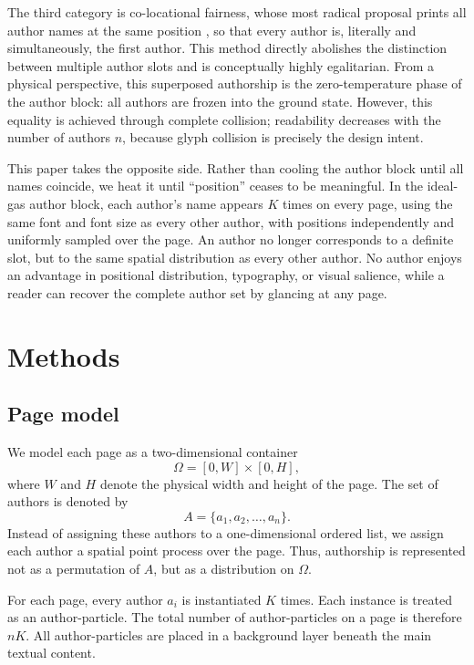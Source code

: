 \documentclass[10pt,letterpaper]{article}
\theoremstyle{definition}
\theoremstyle{remark}
\begin{document}
The third category is {co-locational fairness}, whose most radical proposal prints all author names at the same position \cite{demaine}, so that every author is, literally and simultaneously, the first author. This method directly abolishes the distinction between multiple author slots and is conceptually highly egalitarian. From a physical perspective, this superposed authorship is the zero-temperature phase of the author block: all authors are frozen into the ground state. However, this equality is achieved through complete collision; readability decreases with the number of authors $n$, because glyph collision is precisely the design intent.

This paper takes the opposite side. Rather than cooling the author block until all names coincide, we heat it until “position” ceases to be meaningful. In the {ideal-gas author block}, each author's name appears $K$ times on every page, using the same font and font size as every other author, with positions independently and uniformly sampled over the page. An author no longer corresponds to a definite slot, but to the same spatial distribution as every other author. No author enjoys an advantage in positional distribution, typography, or visual salience, while a reader can recover the complete author set by glancing at any page. 




\section{Methods}

\subsection{Page model}

We model each page as a two-dimensional container
\[
\Omega = [0,W]\times[0,H],
\]
where $W$ and $H$ denote the physical width and height of the page. The set of authors is denoted by
\[
A=\{a_1,a_2,\ldots,a_n\}.
\]
Instead of assigning these authors to a one-dimensional ordered list, we assign each author a spatial point process over the page. Thus, authorship is represented not as a permutation of $A$, but as a distribution on $\Omega$.

For each page, every author $a_i$ is instantiated $K$ times. Each instance is treated as an author-particle. The total number of author-particles on a page is therefore $nK$. All author-particles are placed in a background layer beneath the main textual content.
\end{document}
